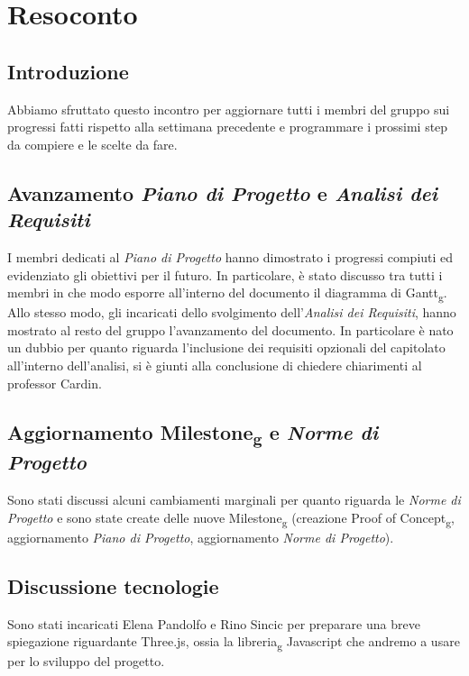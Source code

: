 \section{Resoconto}
\subsection{Introduzione}
Abbiamo sfruttato questo incontro per aggiornare tutti i membri del gruppo sui progressi fatti rispetto alla settimana precedente e programmare i prossimi step da compiere e le scelte da fare.

\subsection{Avanzamento \textit{Piano di Progetto} e \textit{Analisi dei Requisiti}}
I membri dedicati al \textit{Piano di Progetto} hanno dimostrato i progressi compiuti ed evidenziato gli obiettivi per il futuro. In particolare, è stato discusso tra tutti i membri in che modo esporre all'interno del documento il diagramma di Gantt\textsubscript{g}.\\Allo stesso modo, gli incaricati dello svolgimento dell'\textit{Analisi dei Requisiti}, hanno mostrato al resto del gruppo l'avanzamento del documento. In particolare è nato un dubbio per quanto riguarda l'inclusione dei requisiti opzionali del capitolato all'interno dell'analisi, si è giunti alla conclusione di chiedere chiarimenti al professor Cardin.  


\subsection{Aggiornamento Milestone\textsubscript{g} e \textit{Norme di Progetto}}
Sono stati discussi alcuni cambiamenti marginali per quanto riguarda le \textit{Norme di Progetto} e sono state create delle nuove Milestone\textsubscript{g} (creazione Proof of Concept\textsubscript{g}, aggiornamento \textit{Piano di Progetto}, aggiornamento \textit{Norme di Progetto}).

\subsection{Discussione tecnologie}
Sono stati incaricati Elena Pandolfo e Rino Sincic per preparare una breve spiegazione riguardante Three.js, ossia la libreria\textsubscript{g} Javascript che andremo a usare per lo sviluppo del progetto.
